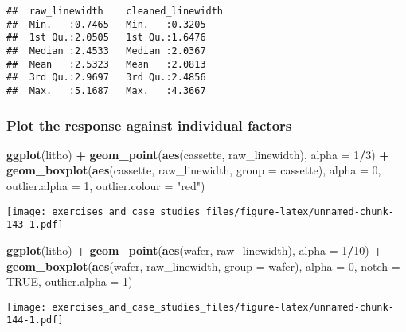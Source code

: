 \documentclass[]{book}
\newenvironment{Shaded}{\begin{snugshade}}{\end{snugshade}}
\newcommand{\DataTypeTok}[1]{\textcolor[rgb]{0.13,0.29,0.53}{#1}}
\newcommand{\DecValTok}[1]{\textcolor[rgb]{0.00,0.00,0.81}{#1}}
\newcommand{\KeywordTok}[1]{\textcolor[rgb]{0.13,0.29,0.53}{\textbf{#1}}}
\newcommand{\NormalTok}[1]{#1}
\newcommand{\OperatorTok}[1]{\textcolor[rgb]{0.81,0.36,0.00}{\textbf{#1}}}
\newcommand{\OtherTok}[1]{\textcolor[rgb]{0.56,0.35,0.01}{#1}}
\newcommand{\StringTok}[1]{\textcolor[rgb]{0.31,0.60,0.02}{#1}}
\theoremstyle{definition}
\theoremstyle{definition}
\theoremstyle{definition}
\theoremstyle{remark}
\begin{document}
\begin{verbatim}
##  raw_linewidth    cleaned_linewidth
##  Min.   :0.7465   Min.   :0.3205   
##  1st Qu.:2.0505   1st Qu.:1.6476   
##  Median :2.4533   Median :2.0367   
##  Mean   :2.5323   Mean   :2.0813   
##  3rd Qu.:2.9697   3rd Qu.:2.4856   
##  Max.   :5.1687   Max.   :4.3667
\end{verbatim}

\hypertarget{plot-the-response-against-individual-factors}{%
\subsubsection{Plot the response against individual
factors}\label{plot-the-response-against-individual-factors}}

\begin{Shaded}
\begin{Highlighting}[]
\KeywordTok{ggplot}\NormalTok{(litho) }\OperatorTok{+}
\StringTok{  }\KeywordTok{geom_point}\NormalTok{(}\KeywordTok{aes}\NormalTok{(cassette, raw_linewidth), }\DataTypeTok{alpha =} \DecValTok{1}\OperatorTok{/}\DecValTok{3}\NormalTok{) }\OperatorTok{+}
\StringTok{  }\KeywordTok{geom_boxplot}\NormalTok{(}\KeywordTok{aes}\NormalTok{(cassette, raw_linewidth, }\DataTypeTok{group =}\NormalTok{ cassette), }\DataTypeTok{alpha =} \DecValTok{0}\NormalTok{, }\DataTypeTok{outlier.alpha =} \DecValTok{1}\NormalTok{, }\DataTypeTok{outlier.colour =} \StringTok{"red"}\NormalTok{)}
\end{Highlighting}
\end{Shaded}

\texttt{[image: exercises\_and\_case\_studies\_files/figure-latex/unnamed-chunk-143-1.pdf]}

\begin{Shaded}
\begin{Highlighting}[]
\KeywordTok{ggplot}\NormalTok{(litho) }\OperatorTok{+}
\StringTok{  }\KeywordTok{geom_point}\NormalTok{(}\KeywordTok{aes}\NormalTok{(wafer, raw_linewidth), }\DataTypeTok{alpha =} \DecValTok{1}\OperatorTok{/}\DecValTok{10}\NormalTok{) }\OperatorTok{+}
\StringTok{  }\KeywordTok{geom_boxplot}\NormalTok{(}\KeywordTok{aes}\NormalTok{(wafer, raw_linewidth, }\DataTypeTok{group =}\NormalTok{ wafer), }\DataTypeTok{alpha =} \DecValTok{0}\NormalTok{, }\DataTypeTok{notch =} \OtherTok{TRUE}\NormalTok{, }\DataTypeTok{outlier.alpha =} \DecValTok{1}\NormalTok{)}
\end{Highlighting}
\end{Shaded}

\texttt{[image: exercises\_and\_case\_studies\_files/figure-latex/unnamed-chunk-144-1.pdf]}
\end{document}
